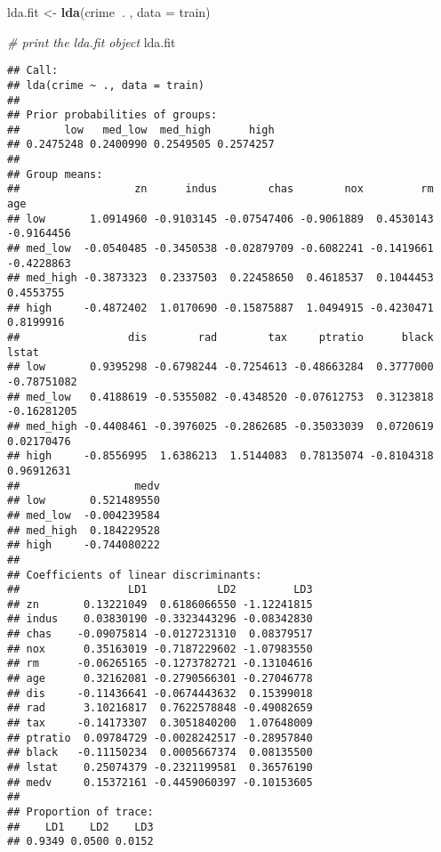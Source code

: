 \documentclass[
]{article}
\newenvironment{Shaded}{\begin{snugshade}}{\end{snugshade}}
\newcommand{\CommentTok}[1]{\textcolor[rgb]{0.56,0.35,0.01}{\textit{#1}}}
\newcommand{\DataTypeTok}[1]{\textcolor[rgb]{0.13,0.29,0.53}{#1}}
\newcommand{\KeywordTok}[1]{\textcolor[rgb]{0.13,0.29,0.53}{\textbf{#1}}}
\newcommand{\NormalTok}[1]{#1}
\newcommand{\OperatorTok}[1]{\textcolor[rgb]{0.81,0.36,0.00}{\textbf{#1}}}
\newcommand{\StringTok}[1]{\textcolor[rgb]{0.31,0.60,0.02}{#1}}
\begin{document}
\begin{Shaded}
\begin{Highlighting}[]
\NormalTok{lda.fit <-}\StringTok{ }\KeywordTok{lda}\NormalTok{(crime}\OperatorTok{~}\NormalTok{. , }\DataTypeTok{data =}\NormalTok{ train)}

\CommentTok{# print the lda.fit object}
\NormalTok{lda.fit}
\end{Highlighting}
\end{Shaded}

\begin{verbatim}
## Call:
## lda(crime ~ ., data = train)
## 
## Prior probabilities of groups:
##       low   med_low  med_high      high 
## 0.2475248 0.2400990 0.2549505 0.2574257 
## 
## Group means:
##                  zn      indus        chas        nox         rm        age
## low       1.0914960 -0.9103145 -0.07547406 -0.9061889  0.4530143 -0.9164456
## med_low  -0.0540485 -0.3450538 -0.02879709 -0.6082241 -0.1419661 -0.4228863
## med_high -0.3873323  0.2337503  0.22458650  0.4618537  0.1044453  0.4553755
## high     -0.4872402  1.0170690 -0.15875887  1.0494915 -0.4230471  0.8199916
##                 dis        rad        tax     ptratio      black       lstat
## low       0.9395298 -0.6798244 -0.7254613 -0.48663284  0.3777000 -0.78751082
## med_low   0.4188619 -0.5355082 -0.4348520 -0.07612753  0.3123818 -0.16281205
## med_high -0.4408461 -0.3976025 -0.2862685 -0.35033039  0.0720619  0.02170476
## high     -0.8556995  1.6386213  1.5144083  0.78135074 -0.8104318  0.96912631
##                  medv
## low       0.521489550
## med_low  -0.004239584
## med_high  0.184229528
## high     -0.744080222
## 
## Coefficients of linear discriminants:
##                 LD1           LD2         LD3
## zn       0.13221049  0.6186066550 -1.12241815
## indus    0.03830190 -0.3323443296 -0.08342830
## chas    -0.09075814 -0.0127231310  0.08379517
## nox      0.35163019 -0.7187229602 -1.07983550
## rm      -0.06265165 -0.1273782721 -0.13104616
## age      0.32162081 -0.2790566301 -0.27046778
## dis     -0.11436641 -0.0674443632  0.15399018
## rad      3.10216817  0.7622578848 -0.49082659
## tax     -0.14173307  0.3051840200  1.07648009
## ptratio  0.09784729 -0.0028242517 -0.28957840
## black   -0.11150234  0.0005667374  0.08135500
## lstat    0.25074379 -0.2321199581  0.36576190
## medv     0.15372161 -0.4459060397 -0.10153605
## 
## Proportion of trace:
##    LD1    LD2    LD3 
## 0.9349 0.0500 0.0152
\end{verbatim}
\end{document}
